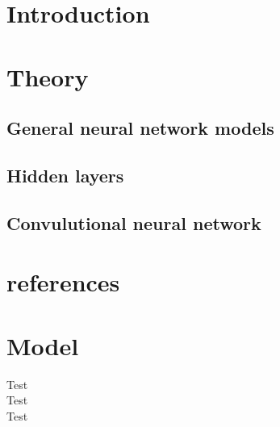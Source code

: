 \documentclass[a4paper]{article}
\begin{document}
\maketitle

\newpage
\tableofcontents
\newpage

\section{Introduction}


\section{Theory}
\subsection{General neural network models}


\subsection{Hidden layers}


\subsection{Convulutional neural network}











\section{references}




\section{Model}


Test \cite{tape}\\
Test \cite{scope}\\
Test \cite{bert}

{}

\end{document}
